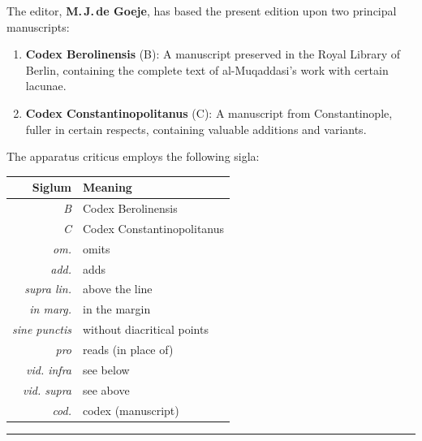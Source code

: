 \documentclass[11pt,a4paper]{article}
\begin{document}
\vspace{0.5cm}

The editor, \textbf{M.\,J.\,de Goeje}, has based the present edition upon two principal manuscripts:

\begin{enumerate}[label=\alph*),leftmargin=2em]
\item \textbf{Codex Berolinensis} (B): A manuscript preserved in the Royal Library of Berlin, containing the complete text of al-Muqaddasi's work with certain lacunae.
\item \textbf{Codex Constantinopolitanus} (C): A manuscript from Constantinople, fuller in certain respects, containing valuable additions and variants.
\end{enumerate}

\vspace{0.5cm}

The apparatus criticus employs the following sigla:

\begin{center}
\begin{longtable}{rl}
\toprule
\textbf{Siglum} & \textbf{Meaning} \\
\midrule
\endhead
\textit{B} & Codex Berolinensis \\
\textit{C} & Codex Constantinopolitanus \\
\textit{om.} & omits \\
\textit{add.} & adds \\
\textit{supra lin.} & above the line \\
\textit{in marg.} & in the margin \\
\textit{sine punctis} & without diacritical points \\
\textit{pro} & reads (in place of) \\
\textit{vid. infra} & see below \\
\textit{vid. supra} & see above \\
\textit{cod.} & codex (manuscript) \\
\bottomrule
\end{longtable}
\end{center}

\vspace{0.5cm}

\begin{center}
\rule{0.5\textwidth}{0.6pt}
\end{center}

\clearpage

\tableofcontents
\clearpage
\end{document}
